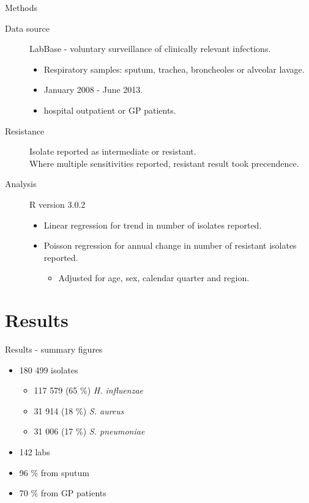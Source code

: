 \documentclass{beamer}
\begin{document}
\begin{frame}{Methods}
\begin{description}
\item[Data source]LabBase - voluntary surveillance of clinically relevant infections. 
\begin{itemize}
\item Respiratory samples: sputum, trachea, broncheoles or alveolar lavage.
\item January 2008 - June 2013.
\item hospital outpatient or GP patients.
\end{itemize}
\pause \item[Resistance] Isolate reported as intermediate or resistant. \hfill \\
Where multiple sensitivities reported, resistant result took precendence.
\pause \item[Analysis] R version 3.0.2
\begin{itemize}
\pause \item Linear regression for trend in number of isolates reported.
\pause \item Poisson regression for annual change in number of resistant isolates reported.
\begin{itemize}
\item Adjusted for age, sex, calendar quarter and region.
\end{itemize}
\end{itemize}
\end{description}
\end{frame}
\section{Results}
\begin{frame}{Results - summary figures}
\begin{itemize}
\item 180 499 isolates
\begin{itemize}
\item 117 579 (65 \%) \textit{H. influenzae}
\item 31 914 (18 \%) \textit{S. aureus}
\item 31 006 (17 \%) \textit{S. pneumoniae}
\end{itemize}
\pause \item 142 labs
\pause \item 96 \% from sputum
\pause \item 70 \% from GP patients
\end{itemize}
\end{frame}
\end{document}
